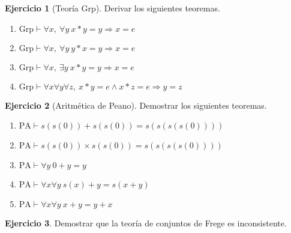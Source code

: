 \documentclass[a4paper,12pt]{book}
\def\Ra{\Rightarrow}
\theoremstyle{definition}
\newtheorem{ejercicio}{Ejercicio}
\begin{document}
\begin{ejercicio}[Teoría Grp]
	Derivar los siguientes teoremas.
	\begin{enumerate}\parskip-.5ex
		\item $\text{Grp}\vdash \forall x,~\forall y~x*y=y\Ra x=e$
		\item $\text{Grp}\vdash \forall x,~\forall y~y*x=y\Ra x=e$
		\item $\text{Grp}\vdash \forall x,~\exists y~x*y=y\Ra x=e$
		\item $\text{Grp}\vdash \forall x\forall y\forall z,~x*y=e\wedge x*z=e \Ra y=z$
	\end{enumerate}
\end{ejercicio}

\begin{ejercicio}[Aritmética de Peano]
	Demostrar los siguientes teoremas.
	\begin{enumerate}\parskip-.5ex
		\item $\text{PA}\vdash  s(s(0))+ s(s(0))=s(s(s(s(0))))$
		\item $\text{PA}\vdash  s(s(0))\times s(s(0))=s(s(s(s(0))))$
		\item $\text{PA}\vdash \forall y~0+y=y$
		\item $\text{PA}\vdash \forall x\forall y~s(x)+y=s(x+y)$
		\item $\text{PA}\vdash \forall x\forall y~x+y=y+x$
	\end{enumerate}
\end{ejercicio}

\begin{ejercicio}
	Demostrar que la teoría de conjuntos de Frege es inconsistente.
\end{ejercicio}
\end{document}
